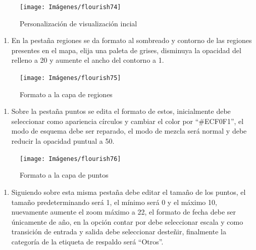 \documentclass[
]{book}
\providecommand{\tightlist}{%
  \setlength{\itemsep}{0pt}\setlength{\parskip}{0pt}}
\begin{document}
\begin{figure}

{\centering \texttt{[image: Imágenes/flourish74]} 

}

\caption{Personalización de visualización incial}\label{fig:paso4mapa3dflourish-fig}
\end{figure}

\begin{enumerate}
\def\labelenumi{\arabic{enumi}.}
\setcounter{enumi}{4}
\tightlist
\item
  En la pestaña regiones se da formato al sombreado y contorno de las regiones presentes en el mapa, elija una paleta de grises, disminuya la opacidad del relleno a 20 y aumente el ancho del contorno a 1.
\end{enumerate}

\begin{figure}

{\centering \texttt{[image: Imágenes/flourish75]} 

}

\caption{Formato a la capa de regiones}\label{fig:paso5mapa3dflourish-fig}
\end{figure}

\begin{enumerate}
\def\labelenumi{\arabic{enumi}.}
\setcounter{enumi}{5}
\tightlist
\item
  Sobre la pestaña puntos se edita el formato de estos, inicialmente debe seleccionar como apariencia círculos y cambiar el color por ``\#ECF0F1'', el modo de esquema debe ser reparado, el modo de mezcla será normal y debe reducir la opacidad puntual a 50.
\end{enumerate}

\begin{figure}

{\centering \texttt{[image: Imágenes/flourish76]} 

}

\caption{Formato a la capa de puntos}\label{fig:paso6mapa3dflourish-fig}
\end{figure}

\begin{enumerate}
\def\labelenumi{\arabic{enumi}.}
\setcounter{enumi}{6}
\tightlist
\item
  Siguiendo sobre esta misma pestaña debe editar el tamaño de los puntos, el tamaño predeterminando será 1, el mínimo será 0 y el máximo 10, nuevamente aumente el zoom máximo a 22, el formato de fecha debe ser únicamente de año, en la opción contar por debe seleccionar escala y como transición de entrada y salida debe seleccionar desteñir, finalmente la categoría de la etiqueta de respaldo será ``Otros''.
\end{enumerate}
\end{document}
